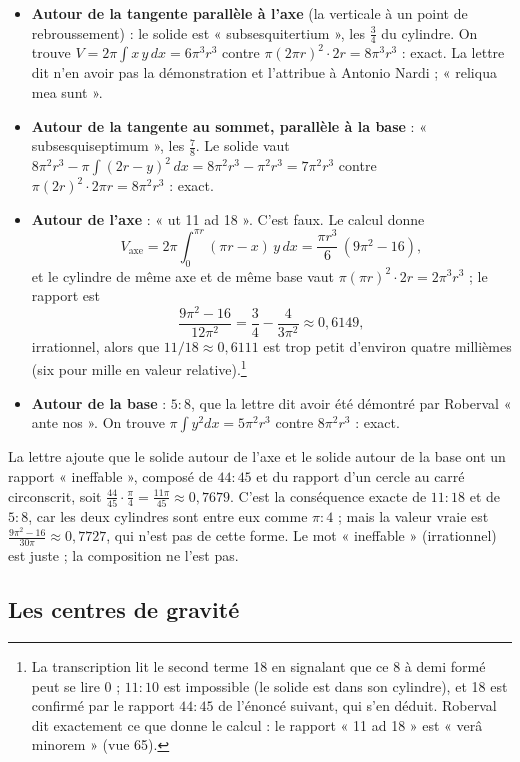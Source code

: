 \documentclass[11pt,a4paper]{article}
\begin{document}
\begin{itemize}
  \item \textbf{Autour de la tangente parallèle à l'axe} (la verticale à un
    point de rebroussement) : le solide est « subsesquitertium », les
    $\tfrac34$ du cylindre. On trouve $V = 2\pi\int x\,y\,dx = 6\pi^3r^3$ contre
    $\pi(2\pi r)^2\cdot 2r = 8\pi^3r^3$ : exact. La lettre dit n'en avoir pas la
    démonstration et l'attribue à Antonio Nardi ; « reliqua mea sunt ».
  \item \textbf{Autour de la tangente au sommet, parallèle à la base} :
    « subsesquiseptimum », les $\tfrac78$. Le solide vaut
    $8\pi^2r^3 - \pi\int (2r-y)^2\,dx = 8\pi^2r^3-\pi^2r^3 = 7\pi^2r^3$ contre
    $\pi(2r)^2\cdot 2\pi r=8\pi^2r^3$ : exact.
  \item \textbf{Autour de l'axe} : « ut 11 ad 18 ». C'est faux. Le calcul donne
    \[
    V_{\text{axe}} = 2\pi\int_0^{\pi r}(\pi r - x)\,y\,dx = \frac{\pi r^3}{6}\,(9\pi^2-16),
    \]
    et le cylindre de même axe et de même base vaut $\pi(\pi r)^2\cdot 2r=2\pi^3r^3$ ;
    le rapport est
    \[
    \frac{9\pi^2-16}{12\pi^2} = \frac34-\frac{4}{3\pi^2}\approx 0{,}6149 ,
    \]
    irrationnel, alors que $11/18\approx 0{,}6111$ est trop petit d'environ
    quatre millièmes (six pour mille en valeur relative).\footnote{La transcription lit le second terme 18 en signalant
    que ce 8 à demi formé peut se lire 0 ; $11:10$ est impossible (le solide est
    dans son cylindre), et 18 est confirmé par le rapport $44:45$ de l'énoncé
    suivant, qui s'en déduit. Roberval dit exactement ce que donne le calcul :
    le rapport « 11 ad 18 » est « verâ minorem » (vue 65).}
  \item \textbf{Autour de la base} : $5:8$, que la lettre dit avoir été démontré
    par Roberval « ante nos ». On trouve $\pi\int y^2dx = 5\pi^2r^3$ contre
    $8\pi^2 r^3$ : exact.
\end{itemize}

La lettre ajoute que le solide autour de l'axe et le solide autour de la base
ont un rapport « ineffable », composé de $44:45$ et du rapport d'un cercle au
carré circonscrit, soit $\frac{44}{45}\cdot\frac{\pi}{4} = \frac{11\pi}{45}
\approx 0{,}7679$. C'est la conséquence exacte de $11:18$ et de $5:8$, car les
deux cylindres sont entre eux comme $\pi:4$ ; mais la valeur vraie est
$\frac{9\pi^2-16}{30\pi}\approx 0{,}7727$, qui n'est pas de cette forme. Le mot
« ineffable » (irrationnel) est juste ; la composition ne l'est pas.

\subsection*{Les centres de gravité}
\end{document}
